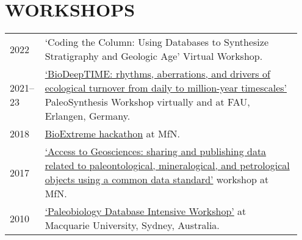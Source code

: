 \documentclass[11pt, a4paper]{article}
\begin{document}
\section{WORKSHOPS}
\begin{longtable}{@{}p{0.1\linewidth} P{0.85\linewidth}@{}}
2022 & `Coding the Column: Using Databases to Synthesize Stratigraphy and Geologic Age' Virtual Workshop.\\
2021--23 & \href{https://www.paleosynthesis.nat.fau.de/index.php/biodeeptime/}{`BioDeepTIME: rhythms, aberrations, and drivers of ecological turnover from daily to million-year timescales'} PaleoSynthesis Workshop virtually and at FAU, Erlangen, Germany.\\
2018 & \href{https://github.com/macroecology/BioExtremes}{BioExtreme hackathon} at MfN.\\
2017 & \href{https://abcd.biowikifarm.net/wiki/Events:WorkshopEFG2017}{`Access to Geosciences: sharing and publishing data related to paleontological, mineralogical, and petrological objects using a common data standard'} workshop at MfN.\\
2010 & \href{http://fossilworks.org/?page=workshop}{`Paleobiology Database Intensive Workshop'} at Macquarie University, Sydney, Australia.\\
\end{longtable}
\end{document}
